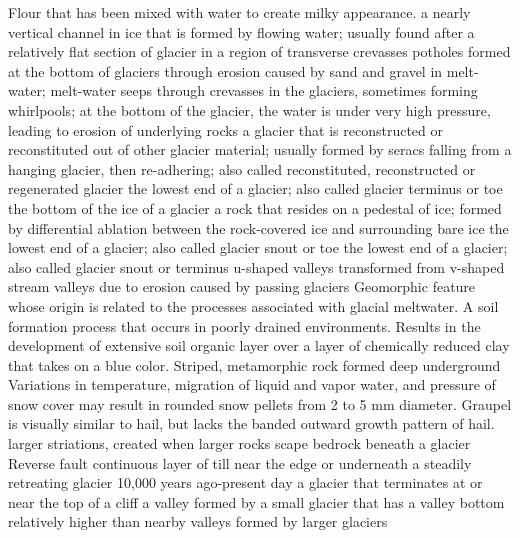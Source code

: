  Flour that has been mixed with water to create milky appearance.
 a nearly vertical channel in ice that is formed by flowing water; usually found after a relatively flat section of glacier in a region of transverse crevasses
 potholes formed at the bottom of glaciers through erosion caused by sand and gravel in melt-water; melt-water seeps through crevasses in the glaciers, sometimes forming whirlpools; at the bottom of the glacier, the water is under very high pressure, leading to erosion of underlying rocks
 a glacier that is reconstructed or reconstituted out of other glacier material; usually formed by seracs falling from a hanging glacier, then re-adhering; also called reconstituted, reconstructed or regenerated glacier
 the lowest end of a glacier; also called glacier terminus or toe
 the bottom of the ice of a glacier
 a rock that resides on a pedestal of ice; formed by differential ablation between the rock-covered ice and surrounding bare ice
 the lowest end of a glacier; also called glacier snout or toe
 the lowest end of a glacier; also called glacier snout or terminus
 u-shaped valleys transformed from v-shaped stream valleys due to erosion caused by passing glaciers
 Geomorphic feature whose origin is related to the processes associated with glacial meltwater.
 A soil formation process that occurs in poorly drained environments. Results in the development of extensive soil organic layer over a layer of chemically reduced clay that takes on a blue color.
 Striped, metamorphic rock formed deep underground
 Variations in temperature, migration of liquid and vapor water, and pressure of snow cover may result in rounded snow pellets from 2 to 5 mm diameter. Graupel is visually similar to hail, but lacks the banded outward growth pattern of hail.
 larger striations, created when larger rocks scape bedrock beneath a glacier
 Reverse fault
 continuous layer of till near the edge or underneath a steadily retreating glacier
 10,000 years ago-present day
 a glacier that terminates at or near the top of a cliff
 a valley formed by a small glacier that has a valley bottom relatively higher than nearby valleys formed by larger glaciers
